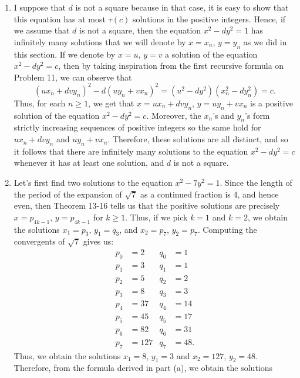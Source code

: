 \begin{solution}
    \begin{enumerate}
        \item I suppose that $d$ is not a square because in that case, it is easy to show that this equation has at most $\tau(c)$ solutions in the positive integers. Hence, if we assume that $d$ is not a square, then the equation $x^2 - dy^2 = 1$ has infinitely many solutions that we will denote by $x = x_n$, $y = y_n$ as we did in this section. If we denote by $x = u$, $y = v$ a solution of the equation $x^2 - dy^2 = c$, then by taking inspiration from the first recursive formula on Problem 11, we can observe that
        $$(ux_n + dvy_n)^2 - d(uy_n + vx_n)^2 = (u^2 - dy^2)(x_n^2 - dy_n^2) = c.$$
        Thus, for each $n \geq 1$, we get that $x = ux_n + dvy_n$, $y = uy_n + vx_n$ is a positive solution of the equation $x^2 - dy^2 = c$. Moreover, the $x_n$'s and $y_n$'s form strictly increasing sequences of positive integers so the same hold for $ux_n + dvy_n$ and $uy_n + vx_n$. Therefore, these solutions are all distinct, and so it follows that there are infinitely many solutions to the equation $x^2 - dy^2 = c$ whenever it has at least one solution, and $d$ is not a square.
        \item Let's first find two solutions to the equation $x^2 - 7y^2 = 1$. Since the length of the period of the expansion of $\sqrt{7}$ as a continued fraction is 4, and hence even, then Theorem 13-16 tells us that the positive solutions are precisely $x = p_{4k-1}$, $y = p_{4k-1}$ for $k \geq 1$. Thus, if we pick $k = 1$ and $k = 2$, we obtain the solutions $x_1 = p_3$, $y_1 = q_3$, and $x_2 = p_7$, $y_2 = p_7$. Computing the convergents of $\sqrt{7}$ gives us:
        \begin{align*}
            p_0 &= 2 & q_0 &= 1 \\
            p_1 &= 3 & q_1 &= 1  \\
            p_2 &= 5 & q_2 &= 2 \\
            p_3 &= 8 & q_3 &= 3 \\
            p_4 &= 37 & q_4 &= 14 \\
            p_5 &= 45 & q_5 &= 17 \\
            p_6 &= 82 & q_6 &= 31 \\
            p_7 &= 127 & q_7 &= 48.
        \end{align*}
        Thus, we obtain the solutions $x_1 = 8$, $y_1 = 3$ and $x_2 = 127$, $y_2 = 48$. Therefore, from the formula derived in part (a), we obtain the solutions

\end{enumerate}
\end{solution}
